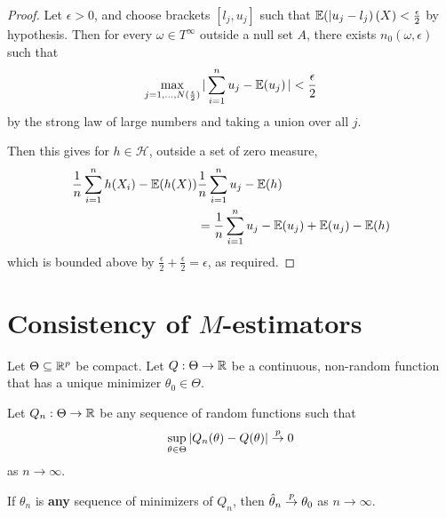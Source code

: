 \begin{proof}
  Let $\epsilon > 0$, and choose brackets $[l_{j}, u_{j}]$ such that
  $\E{|u_{j} - l_{j}}(X) < \frac{\epsilon}{2}$ by hypothesis. Then for
  every $\omega \in T^{\infty}$ outside a null set $A$, there exists
  $n_{0}(\omega, \epsilon)$ such that
  \begin{align}
    \label{eq:41}
    \max_{j = 1, \dots, N(\frac{\epsilon}{2})} |\sum_{i=1}^{n} u_{j} -
    \E{u_{j}}| < \frac{\epsilon}{2}
  \end{align} by the strong law of large numbers and taking a union
  over all $j$.

  Then this gives for $h \in \mathcal{H}$, outside a set of zero
  measure,
  \begin{align}
    \label{eq:42}
    \frac{1}{n} \sum_{i=1}^{n} h(X_{i}) - \E{h(X)} & \frac{1}{n} \sum_{i=1}^{n} u_{j} -  \E{h} \\
    &= \frac{1}{n} \sum_{i=1}^{n} u_{j} - \E{u_{j}} + \E{u_{j}} - \E{h}
  \end{align} which is bounded above by $\frac{\epsilon}{2} +
  \frac{\epsilon}{2} = \epsilon$, as required.
\end{proof}

\section{Consistency of $M$-estimators}
\label{sec:cons-m-estim-1}

\begin{thm}
  \label{defn:parametric_statistical_models:1}
  Let $\Theta \subseteq \mathbb{R}^{p}$ be compact.  Let $Q: \Theta
  \rightarrow \mathbb{R}$ be a continuous, non-random function that has a
  unique minimizer $\theta_{0} \in \Theta$.

  Let $Q_{n}: \Theta \rightarrow \mathbb{R}$ be any sequence of random
  functions such that
  \begin{equation}
    \label{eq:32}
    \sup_{\theta \in \Theta} |Q_{n}(\theta) - Q(\theta)| \overset{p}{\rightarrow} 0
  \end{equation} as $n \rightarrow \infty$.

  If $\theta_{n}$ is \textbf{any} sequence of minimizers of $Q_{n}$,
  then $\hat \theta_{n} \overset{p}{\rightarrow} \theta_{0}$ as $n \rightarrow \infty$.
\end{thm}

